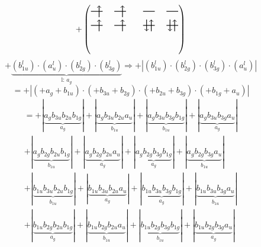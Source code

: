 \documentclass{article}
\begin{document}
\[+\left(\begin{tikzpicture}
    \draw[thick] (0,0) -- (0.5,0); %
    \draw[thick] (1,0) -- (1.5,0); %
    \draw[thick] (0,-0.6) -- (0.5,-0.6); %
    \draw[thick] (1,-0.6) -- (1.5,-0.6); %
\draw[->, thick] (0.35, -0.25) -- (0.35, 0.25); 
\draw[->, thick] (1.35, -0.25) -- (1.35, 0.25); 
\draw[-> , thick] (0.35, -0.85) -- (0.35, -0.35); 
 \draw[-> , thick] (1.35, -0.85) -- (1.35, -0.35); 
\end{tikzpicture}\qquad \begin{tikzpicture}
    \draw[thick] (0,0) -- (0.5,0); %
    \draw[thick] (1,0) -- (1.5,0); %
    \draw[thick] (0,-0.6) -- (0.5,-0.6); %
    \draw[thick] (1,-0.6) -- (1.5,-0.6); %
\draw[-> , thick] (0.35, -0.85) -- (0.35, -0.35); 
\draw[<- , thick] (0.15, -0.85) -- (0.15, -0.35); 
 \draw[-> , thick] (1.35, -0.85) -- (1.35, -0.35); 
\draw[<- , thick] (1.15, -0.85) -- (1.15, -0.35); 
\end{tikzpicture}\right)\]$$+ \underbrace{(b_{1u}^{l})\cdot (a_{u}^{l})\cdot (b_{2g}^{l})\cdot (b_{3g}^{l})}_{\text{l: }a_{g}}\Rightarrow +\left|(b_{1u}^{l}) \cdot (b_{2g}^{l}) \cdot (b_{3g}^{l}) \cdot (a_{u}^{l})\right|$$$$=+\left|(+a_{g}+b_{1u}) \cdot (+b_{3u}+b_{2g}) \cdot (+b_{2u}+b_{3g}) \cdot (+b_{1g}+a_{u})\right|$$\begin{multline*}
=+\left|\underbrace{a_{g} b_{3u} b_{2u} b_{1g}}_{a_{g}}\right|+\left|\underbrace{a_{g} b_{3u} b_{2u} a_{u}}_{b_{1u}}\right|+\left|\underbrace{a_{g} b_{3u} b_{3g} b_{1g}}_{b_{1u}}\right|+\left|\underbrace{a_{g} b_{3u} b_{3g} a_{u}}_{a_{g}}\right|\\
+\left|\underbrace{a_{g} b_{2g} b_{2u} b_{1g}}_{b_{1u}}\right|+\left|\underbrace{a_{g} b_{2g} b_{2u} a_{u}}_{a_{g}}\right|+\left|\underbrace{a_{g} b_{2g} b_{3g} b_{1g}}_{a_{g}}\right|+\left|\underbrace{a_{g} b_{2g} b_{3g} a_{u}}_{b_{1u}}\right|\\
+\left|\underbrace{b_{1u} b_{3u} b_{2u} b_{1g}}_{b_{1u}}\right|+\left|\underbrace{b_{1u} b_{3u} b_{2u} a_{u}}_{a_{g}}\right|+\left|\underbrace{b_{1u} b_{3u} b_{3g} b_{1g}}_{a_{g}}\right|+\left|\underbrace{b_{1u} b_{3u} b_{3g} a_{u}}_{b_{1u}}\right|\\
+\left|\underbrace{b_{1u} b_{2g} b_{2u} b_{1g}}_{a_{g}}\right|+\left|\underbrace{b_{1u} b_{2g} b_{2u} a_{u}}_{b_{1u}}\right|+\left|\underbrace{b_{1u} b_{2g} b_{3g} b_{1g}}_{b_{1u}}\right|+\left|\underbrace{b_{1u} b_{2g} b_{3g} a_{u}}_{a_{g}}\right|

\end{multline*}
\end{document}
